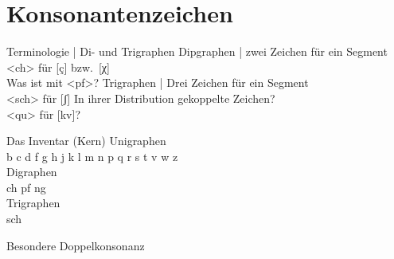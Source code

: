\section{Konsonantenzeichen}

\begin{frame}
  {Terminologie | Di- und Trigraphen}
  \onslide<+->
  \onslide<+->
  Dipgraphen | zwei Zeichen für ein Segment\\
  <ch> für [ç] bzw.\ [χ]\\
  \onslide<+->
  Was ist mit <pf>?
  \onslide<+->
  \Zeile
  Trigraphen | Drei Zeichen für ein Segment\\
  <sch> für [ʃ]
  \Zeile
  \onslide<+->
  In ihrer Distribution gekoppelte Zeichen?\\
  <qu> für [kv]?
\end{frame}

\begin{frame}
  {Das Inventar (Kern)}
  \onslide<+->
  \onslide<+->
  Unigraphen\\
  b c d f g h j k l m n p q r s t v w z\\
  \Zeile
  Digraphen\\
  ch pf ng \\
  \Zeile
  Trigraphen\\
  sch\\
\end{frame}

\begin{frame}
  {Besondere Doppelkonsonanz}
  \onslide<+->
  \onslide<+->
\end{frame}


